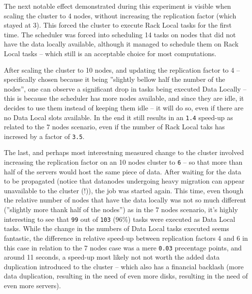 The next notable effect demonstrated during this experiment is visible when scaling the cluster to 4 nodes, without increasing the replication factor (which stayed at 3). This forced the cluster to execute Rack Local tasks for the first time. The scheduler was forced into scheduling 14 tasks on nodes that did not have the data locally available, although it managed to schedule them on Rack Local tasks -- which still is an acceptable choice for most computations.

After scaling the cluster to 10 nodes, and updating the replication factor to 4 -- specifically chosen because it being ''slightly bellow half the number of the nodes'', one can observe a significant drop in tasks being executed Data Locally -- this is because the scheduler has more nodes available, and since they are idle, it decides to use them instead of keeping them idle -- it will do so, even if there are no Data Local slots available. In the end it still results in an \verb|1.4| speed-up as related to the 7 nodes scenario, even if the number of Rack Local taks has incresed by a factor of \verb|3.5|.

The last, and perhaps most interestning measured change to the cluster involved increasing the replication factor on an 10 nodes cluster to \verb|6| -- so that more than half of the servers would host the same piece of data. After waiting for the data to be propagated (notice that datanodes undergoing heavy migration can appear unavailable to the cluster (!)), the job was started again. This time, even though the relative number of nodes that have the data locally was not so much different (''slightly more thank half of the nodes'') as in the 7 nodes scenario, it's highly interesting to see that \verb|99| out of \verb|103| (96\%) tasks were executed as Data Local tasks. While the change in the numbers of Data Local tasks executed seems fantastic, the difference in relative speed-up between replication factors 4 and 6 in this case in relation to the 7 nodes case was a mere \verb|0.03| precentage points, and around 11 seconds, a speed-up most likely not not worth the added data duplication introduced to the cluster -- which also has a financial backlash (more data duplication, resulting in the need of even more disks, resulting in the need of even more servers).


